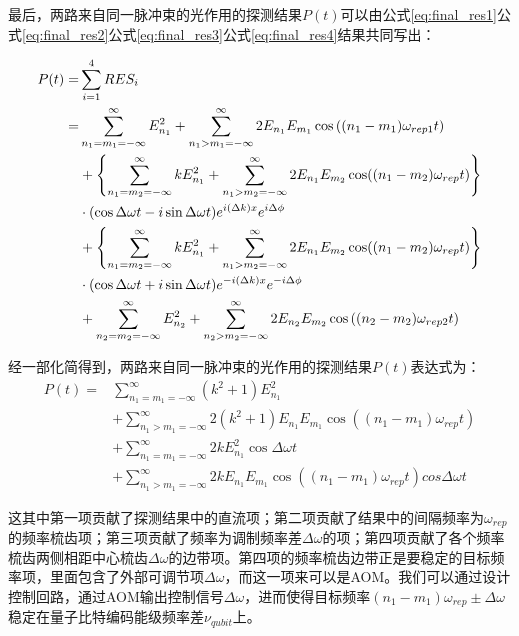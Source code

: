 最后，两路来自同一脉冲束的光作用的探测结果$P(t)$可以由公式\eqref{eq:final_res1}公式\eqref{eq:final_res2}公式\eqref{eq:final_res3}公式\eqref{eq:final_res4}结果共同写出：
\begin{small}
\begin{align}
    P(t)=&\sum_{i=1}^{4}RES_i\\
    =&\sum_{n_1=m_1=-\infty}^{\infty}E_{n_1}^2 + \sum_{n_1>m_1=-\infty}^{\infty}2E_{n_1} E_{m_1} \cos\left((n_1-m_1)\omega_{rep1}t\right)\\
    &+\left\{\sum_{n_1=m_2=-\infty}^{\infty}kE_{n_1}^2+\sum_{n_1>m_2=-\infty}^{\infty}2E_{n_1}E_{m_2}\cos((n_1-m_2)\omega_{rep}t)\right\}\notag\\
    & \cdot (\cos\Delta\omega t-i\sin\Delta\omega t)e^{i(\Delta k)x}e^{i\Delta\phi}\\
    &+\left\{\sum_{n_1=m_2=-\infty}^{\infty}kE_{n_1}^2+\sum_{n_1>m_2=-\infty}^{\infty}2E_{n_1}E_{m_2}\cos((n_1-m_2)\omega_{rep}t)\right\}\notag\\
    & \cdot (\cos\Delta\omega t+i\sin\Delta\omega t)e^{-i(\Delta k)x}e^{-i\Delta\phi}\\
    &+\sum_{n_2=m_2=-\infty}^{\infty}E_{n_2}^2 + \sum_{n_2>m_2=-\infty}^{\infty}2E_{n_2} E_{m_2} \cos\left((n_2-m_2)\omega_{rep2}t\right)
\end{align}
\end{small}

经一部化简得到，两路来自同一脉冲束的光作用的探测结果$P(t)$表达式为：
\begin{align}
    P(t)=&\sum_{n_1=m_1=-\infty}^{\infty}(k^2+1)E_{n_1}^2\\
    &+\sum_{n_1>m_1=-\infty}^{\infty}2(k^2+1)E_{n_1}E_{m_1}\cos\left((n_1-m_1)\omega_{rep}t\right)\\
    &+\sum_{n_1=m_1=-\infty}^{\infty}2kE_{n_1}^2\cos\Delta\omega t\\
    &+\sum_{n_1>m_1=-\infty}^{\infty}2kE_{n_1}E_{m_1}\cos\left((n_1-m_1)\omega_{rep}t\right)cos\Delta\omega t
\end{align}

这其中第一项贡献了探测结果中的直流项；第二项贡献了结果中的间隔频率为$\omega_{rep}$的频率梳齿项；第三项贡献了频率为调制频率差$\Delta\omega$的项；第四项贡献了各个频率梳齿两侧相距中心梳齿$\Delta\omega$的边带项。第四项的频率梳齿边带正是要稳定的目标频率项，里面包含了外部可调节项$\Delta\omega$，而这一项来可以是AOM。我们可以通过设计控制回路，通过AOM输出控制信号$\Delta\omega$，进而使得目标频率$(n_1-m_1)\omega_{rep}\pm \Delta\omega$稳定在量子比特编码能级频率差$\nu_{qubit}$上。



